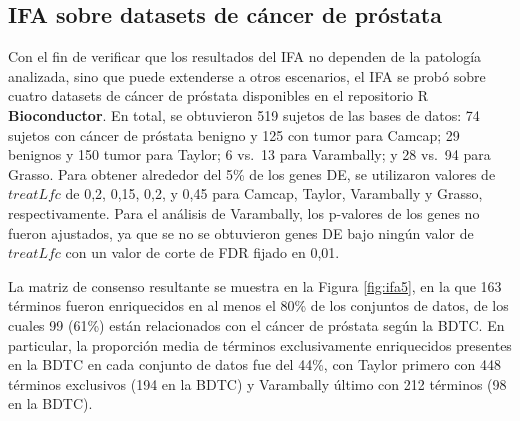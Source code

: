 \documentclass[12pt,twoside]{reedthesis}
\begin{document}
\hypertarget{ifa-sobre-datasets-de-cuxe1ncer-de-pruxf3stata}{%
\subsection{IFA sobre datasets de cáncer de próstata}\label{ifa-sobre-datasets-de-cuxe1ncer-de-pruxf3stata}}

\par

Con el fin de verificar que los resultados del IFA no dependen de la patología analizada, sino que puede extenderse a otros escenarios, el IFA se probó sobre cuatro datasets de cáncer de próstata disponibles en el repositorio R \textbf{Bioconductor}. En total, se obtuvieron 519 sujetos de las bases de datos: 74 sujetos con cáncer de próstata benigno y 125 con tumor para Camcap; 29 benignos y 150 tumor para Taylor; 6 vs.~13 para Varambally; y 28 vs.~94 para Grasso. Para obtener alrededor del 5\% de los genes DE, se utilizaron valores de \(treatLfc\) de 0,2, 0,15, 0,2, y 0,45 para Camcap, Taylor, Varambally y Grasso, respectivamente. Para el análisis de Varambally, los p-valores de los genes no fueron ajustados, ya que se no se obtuvieron genes DE bajo ningún valor de \(treatLfc\) con un valor de corte de FDR fijado en 0,01.

\par

La matriz de consenso resultante se muestra en la Figura \ref{fig:ifa5}, en la que 163 términos fueron enriquecidos en al menos el 80\% de los conjuntos de datos, de los cuales 99 (61\%) están relacionados con el cáncer de próstata según la BDTC. En particular, la proporción media de términos exclusivamente enriquecidos presentes en la BDTC en cada conjunto de datos fue del 44\%, con Taylor primero con 448 términos exclusivos (194 en la BDTC) y Varambally último con 212 términos (98 en la BDTC).
\end{document}
